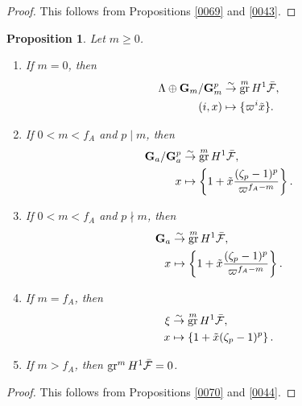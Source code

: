 \documentclass{amsart}
\newtheorem{Prop}[Thm]{Proposition}
\theoremstyle{remark}
\numberwithin{equation}{subsection}
\newcommand{\isomto}{\overset{\sim}{\to}}
\newcommand{\Gm}{\mathbf{G}_{m}}
\newcommand{\Ga}{\mathbf{G}_{a}}
\DeclareMathOperator{\gr}{gr}
\begin{document}
\begin{proof}
	This follows from
	Propositions \ref{0069} and \ref{0043}.
\end{proof}

\begin{Prop} \label{0101}
	Let $m \ge 0$.
	\begin{enumerate}
		\item \label{0256}
			If $m = 0$, then
				\begin{align*}
							\Lambda \oplus \Gm / \Gm^{p}
					&	\isomto
							\gr^{m} H^{1} \Bar{\mathcal{F}},
					\\
							(i, x)
					&	\mapsto
							\{\varpi^{i} \Tilde{x}\}.
				\end{align*}
		\item \label{0257}
			If $0 < m < f_{A}$ and $p \mid m$, then
				\begin{align*}
							\Ga / \Ga^{p}
					&	\isomto
							\gr^{m} H^{1} \Bar{\mathcal{F}},
					\\
							x
					&	\mapsto
							\left\{
									1
								+
									\Tilde{x}
									\frac{
										(\zeta_{p} - 1)^{p}
									}{
										\varpi^{f_{A} - m}
									}
							\right\}.
				\end{align*}
		\item \label{0258}
			If $0 < m < f_{A}$ and $p \nmid m$, then
				\begin{align*}
							\Ga
					&	\isomto
							\gr^{m} H^{1} \Bar{\mathcal{F}},
					\\
							x
					&	\mapsto
							\left\{
								1 + \Tilde{x} \frac{(\zeta_{p} - 1)^{p}}{\varpi^{f_{A} - m}}
							\right\}.
				\end{align*}
		\item \label{0259}
			If $m = f_{A}$, then
				\begin{align*}
							\xi
					&	\isomto
							\gr^{m} H^{1} \Bar{\mathcal{F}},
					\\
							x
					&	\mapsto
							\left\{
								1 + \Tilde{x} (\zeta_{p} - 1)^{p}
							\right\}.
				\end{align*}
		\item \label{0260}
			If $m > f_{A}$, then $\gr^{m} H^{1} \Bar{\mathcal{F}} = 0$.
	\end{enumerate}
\end{Prop}

\begin{proof}
	This follows from
	Propositions \ref{0070} and \ref{0044}.
\end{proof}
\end{document}
